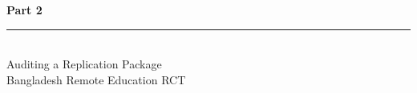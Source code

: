 \documentclass[aspectratio=169, 10pt]{beamer}
\begin{document}
%

{
\begin{frame}
\centering\vfill
{\fontsize{22}{28}\bfseries\selectfont\color{white} Part 2}\\[6pt]
{\color{UVMGold}\rule{5cm}{0.8pt}}\\[6pt]
{\normalsize\color{UVMGold} Auditing a Replication Package}\\[4pt]
{\small\color{PaleSage} Bangladesh Remote Education RCT}
\vfill
\end{frame}
}
\end{document}
